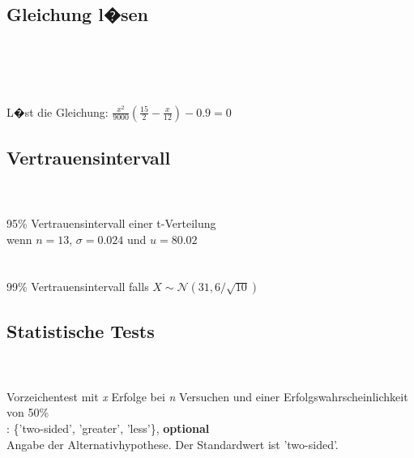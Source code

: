 \documentclass{article}
\begin{document}
\begin{multicols*}{3}
\subsection*{Gleichung l�sen}
 \\
 \\
 \\
 \\
L�st die Gleichung: $\frac{x^2}{9000} (\frac{15}{2} - \frac{x}{12}) - 0.9 = 0$

\subsection*{Vertrauensintervall}
 \\
 \\
95\% Vertrauensintervall einer t-Verteilung \\
wenn $n=13$, $\sigma=0.024$ und $u=80.02$ \\

 \\
 \\
99\% Vertrauensintervall falls $X \sim \mathcal{N}(31, 6 / \sqrt{10})$

\vfill\null
\columnbreak

\subsection*{Statistische Tests}
 \\
\\
Vorzeichentest mit \textit{x} Erfolge bei \textit{n} Versuchen
und einer Erfolgswahrscheinlichkeit von 50\%
\vspace{0.5em}\\
 : \{'two-sided', 'greater', 'less'\}, \textbf{optional}\\
Angabe der Alternativhypothese. Der Standardwert ist 'two-sided'.\\


\end{multicols*}
\end{document}
